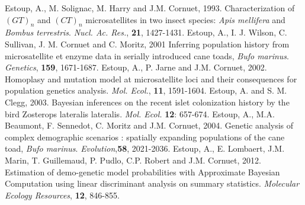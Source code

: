\begin{thebibliography}{a}
 Estoup, A., M. Solignac, M. Harry and J.M. Cornuet, 1993. Characterization of $(GT)_n$ and $(CT)_n$ microsatellites in two insect species: \emph{Apis mellifera} and \emph{Bombus terrestris}. \emph{Nucl. Ac. Res.}, \textbf{21}, 1427-1431.
 Estoup, A., I. J. Wilson, C. Sullivan, J. M. Cornuet and C. Moritz, 2001 Inferring population history from microsatellite et enzyme data in serially introduced cane toads, \emph{Bufo marinus}. \emph{Genetics}, \textbf{159}, 1671-1687.
Estoup, A., P. Jarne and J.M. Cornuet, 2002.
 Homoplasy and mutation model at microsatellite loci and their consequences for population
 genetics analysis. \emph{Mol. Ecol.}, \textbf{11}, 1591-1604.
 Estoup, A. and S. M. Clegg, 2003. Bayesian inferences on the recent islet colonization history by the bird Zosterops lateralis lateralis. \emph{Mol. Ecol.} \textbf{12}: 657-674.
Estoup, A., M.A. Beaumont, F. Sennedot, C. Moritz and J.M. Cornuet, 2004. Genetic analysis of complex demographic scenarios : spatially expanding populations of the cane toad, \emph{Bufo marinus}. \emph{Evolution},\textbf{58}, 2021-2036.
Estoup, A., E. Lombaert, J.M. Marin, T. Guillemaud, P. Pudlo, C.P. Robert and J.M. Cornuet, 2012. Estimation of demo-genetic model probabilities with Approximate Bayesian Computation using linear discriminant analysis on summary statistics. \emph{Molecular Ecology Resources}, \textbf{12}, 846-855.


\end{thebibliography}
